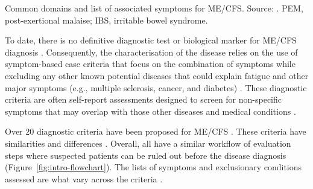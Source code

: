 \begin{table}[htbp]
    \centering
    \caption[Common domains and list of associated symptoms for ME/CFS]{Common domains and list of associated symptoms for ME/CFS. Source: \citet{carruthers2003MyalgicEncephalomyelitis, instituteofmedicine2015MyalgicEncephalomyelitis, lacerda2017UKME}. PEM, post-exertional malaise; IBS, irritable bowel syndrome.}
    \resizebox{\textwidth}{!}{}
    \label{tab:intro-symptom-domains}
\end{table}

To date, there is no definitive diagnostic test or biological marker for ME/CFS diagnosis \citep{scheibenbogen2017EuropeanME}. Consequently, the characterisation of the disease relies on the use of symptom-based case criteria that focus on the combination of symptoms while excluding any other known potential diseases that could explain fatigue and other major symptoms (e.g., multiple sclerosis, cancer, and diabetes) \citep{smith2014DiagnosisTreatment, instituteofmedicine2015MyalgicEncephalomyelitis}. These diagnostic criteria are often self-report assessments designed to screen for non-specific symptoms that may overlap with those other diseases and medical conditions \citep{brurberg2014CaseDefinitions}.

Over 20 diagnostic criteria have been proposed for ME/CFS \citep{bayliss2014OvercomingBarriers, brurberg2014CaseDefinitions}. These criteria have similarities and differences \citep{lim2020ReviewCase, malato2021Statisticalchallenges}. Overall, all have a similar workflow of evaluation steps where suspected patients can be ruled out before the disease diagnosis (Figure~\ref{fig:intro-flowchart}). The lists of symptoms and exclusionary conditions assessed are what vary across the criteria \citep{lim2020ReviewCase}.

